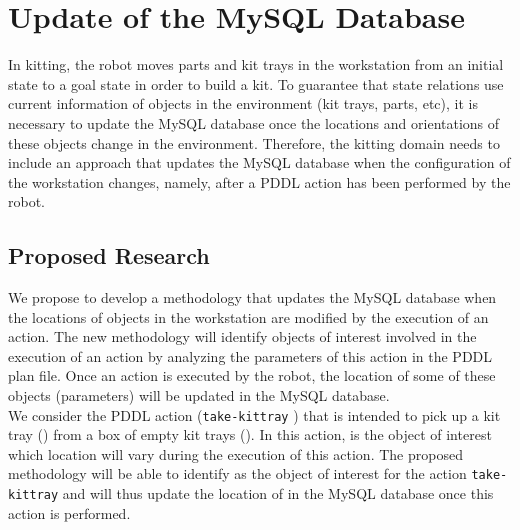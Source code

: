 \section{Update of the MySQL Database}\label{task4}

In kitting, the robot moves parts and kit trays in the workstation from an initial state to a goal state in order to build a kit. To guarantee that state relations use current information of objects in the environment (kit trays, parts, etc), it is necessary to update the MySQL database once the locations and orientations of these objects change in the environment. Therefore, the kitting domain needs to include an approach that updates the MySQL database when the configuration of the workstation changes, namely, after a PDDL action has been performed by the robot.

\subsection{Proposed Research}
We propose to develop a methodology that updates the MySQL database when the locations of objects in the workstation are modified by the execution of an action. The new methodology will identify objects of interest involved in the execution of an action by analyzing the parameters of this action in the PDDL plan file. Once an action is executed by the robot, the location of some of these objects (parameters) will be updated in the MySQL database. \\We consider the PDDL action (\texttt{take-kittray}     ) that is intended to pick up a kit tray () from a box of empty kit trays (). In this action,  is the object of interest which location will vary during the execution of this action. The proposed methodology will be able to identify  as the object of interest for the action \texttt{take-kittray} and will thus update the location of  in the MySQL database once this action is performed. 